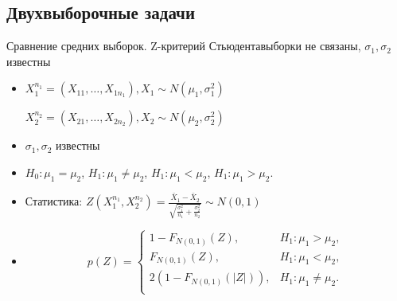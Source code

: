 \documentclass[11pt,pdf,utf8,hyperref={unicode},aspectratio=169]{beamer}
\begin{document}
\subsection{Двухвыборочные задачи}
\begin{frame}[label=ztest2u]{\hyperlink{onesample}{} Сравнение средних выборок. Z-критерий Стьюдента}{выборки не связаны, $\sigma_1, \sigma_2$ известны}
    \begin{itemize}
            \item {}

             $X_1^{n_1}=\left(X_{11},\ldots,X_{1n_1}\right), X_{1} \sim N\left(\mu_1, \sigma_1^2\right)$

            $X_2^{n_2}=\left(X_{21},\ldots,X_{2n_2}\right), X_{2} \sim N\left(\mu_2, \sigma_2^2\right)$
            \item $\sigma_1, \sigma_2$ известны \\
            \item  $H_0\colon \mu_1=\mu_2$,\qquad
             $H_1\colon \mu_1 \neq \mu_2$,
             $H_1\colon \mu_1 < \mu_2$,
             $H_1\colon \mu_1  >\mu_2$.
            \item Статистика: \alert{$\displaystyle Z\left(X_1^{n_1}, X_2^{n_2}\right) = \frac{\bar{X}_1-\bar{X}_2}{\sqrt{\frac{\sigma_1^2}{n_1}+\frac{\sigma_2^2}{n_2}}} \sim N(0,1)$}
            \item {}
            $$
            p\left(Z\right) = \begin{cases}
                1-F_{N(0,1)}(Z), & H_1 \colon \mu_1>\mu_2, \\
                F_{N(0,1)}(Z), & H_1 \colon \mu_1 < \mu_2, \\
                2\left(1-F_{N(0,1)}(|Z|)\right), & H_1 \colon \mu_1\neq\mu_2. \\
            \end{cases}
            $$
    \end{itemize}
\end{frame}
%
%
%
\end{document}
